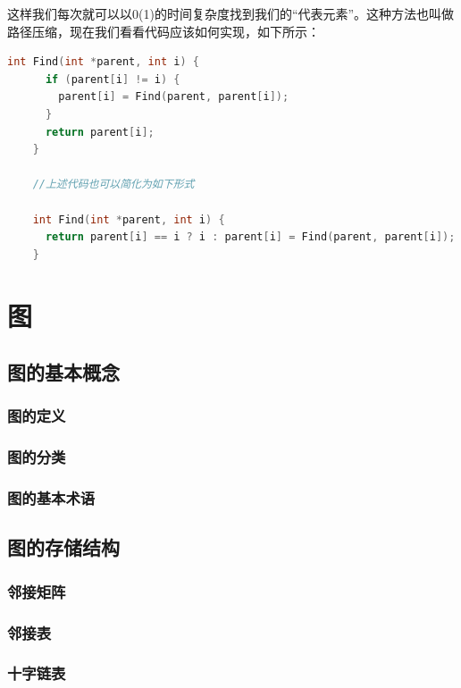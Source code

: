 \documentclass[lang=cn,newtx,10pt,scheme=chinese]{elegantbook}
\begin{document}
  这样我们每次就可以以0(1)的时间复杂度找到我们的“代表元素”。这种方法也叫做路径压缩，现在我们看看代码应该如何实现，如下所示：

  \begin{lstlisting}[language=C++, caption={路径压缩}]
    int Find(int *parent, int i) {
      if (parent[i] != i) {
        parent[i] = Find(parent, parent[i]);
      }
      return parent[i];
    }

    //上述代码也可以简化为如下形式

    int Find(int *parent, int i) {
      return parent[i] == i ? i : parent[i] = Find(parent, parent[i]);
    }
  \end{lstlisting}
\chapter{图}

\section{图的基本概念}

\subsection{图的定义}

\subsection{图的分类}

\subsection{图的基本术语}

\section{图的存储结构}

\subsection{邻接矩阵}

\subsection{邻接表}

\subsection{十字链表}
\end{document}
